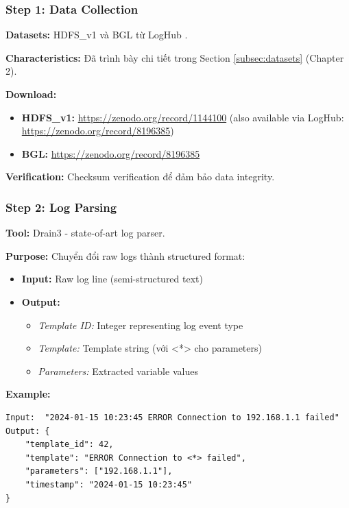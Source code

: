 \subsubsection{Step 1: Data Collection}

\textbf{Datasets:} HDFS\_v1 và BGL từ LogHub \cite{he2020loghub}.

\textbf{Characteristics:} Đã trình bày chi tiết trong Section \ref{subsec:datasets} (Chapter 2).

\textbf{Download:}
\begin{itemize}
    \item \textbf{HDFS\_v1:} \url{https://zenodo.org/record/1144100} (also available via LogHub: \url{https://zenodo.org/record/8196385})
    \item \textbf{BGL:} \url{https://zenodo.org/record/8196385}
\end{itemize}

\textbf{Verification:} Checksum verification để đảm bảo data integrity.

\subsubsection{Step 2: Log Parsing}

\textbf{Tool:} Drain3 \cite{he2017drain} - state-of-art log parser.

\textbf{Purpose:} Chuyển đổi raw logs thành structured format:
\begin{itemize}
    \item \textbf{Input:} Raw log line (semi-structured text)
    \item \textbf{Output:} 
        \begin{itemize}
            \item \textit{Template ID:} Integer representing log event type
            \item \textit{Template:} Template string (với <*> cho parameters)
            \item \textit{Parameters:} Extracted variable values
        \end{itemize}
\end{itemize}

\textbf{Example:}
\begin{verbatim}
Input:  "2024-01-15 10:23:45 ERROR Connection to 192.168.1.1 failed"
Output: {
    "template_id": 42,
    "template": "ERROR Connection to <*> failed",
    "parameters": ["192.168.1.1"],
    "timestamp": "2024-01-15 10:23:45"
}
\end{verbatim}

